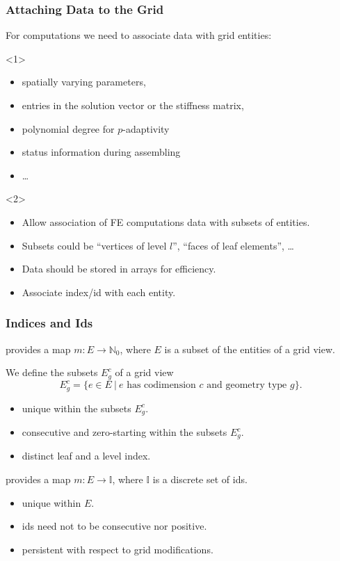 \documentclass[aspectratio=169,11pt]{beamer}
\theoremstyle{definition}
\begin{document}
\begin{frame} \frametitle{Attaching Data to the Grid}

  For computations we need to associate data with grid entities:

  \begin{onlyenv}<1>
  \begin{itemize}
  \item spatially varying parameters,
  \item entries in the solution vector or the stiffness matrix,
  \item polynomial degree for $p$-adaptivity
  \item status information during assembling
  \item \ldots
  \end{itemize}
  \end{onlyenv}

  \begin{onlyenv}<2>
  \begin{itemize}
  \item Allow association of FE computations data with subsets of entities.
  \item Subsets could be ``vertices of level $l$'', ``faces of leaf
    elements'', \ldots
  \item Data should be stored in arrays for efficiency.
  \item Associate index/id with each entity.
  \end{itemize}
  \end{onlyenv}

\end{frame}

\begin{frame}
  \frametitle{Indices and Ids}

  provides a map $m : E \to \mathbb{N}_0$,
  where $E$ is a subset of the entities of a grid view.

  We define the subsets $E_g^c$ of a grid view
  \[ E_g^c = \{e\in E \ | \ \textrm{$e$ has codimension $c$ and geometry type $g$} \}.\]

  \begin{itemize}
  \item unique within the subsets $E_g^c$.
  \item consecutive and zero-starting within the subsets $E_g^c$.
  \item distinct leaf and a level index.
  \end{itemize}

  \pause
  provides a map $m : E \to \mathbb{I}$, where $\mathbb{I}$ is a discrete
  set of ids.

  \begin{itemize}
  \item unique within $E$.
  \item ids need not to be consecutive nor positive.
  \item persistent with respect to grid modifications.
  \end{itemize}

\end{frame}
\end{document}
